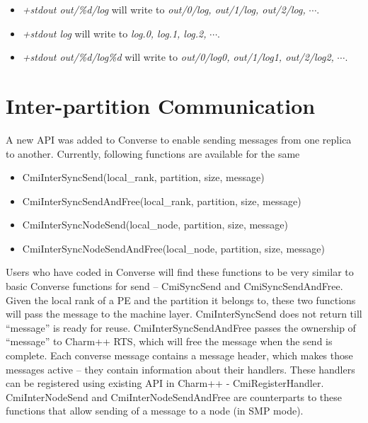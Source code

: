 \begin{itemize}
\item \emph{+stdout out/\%d/log} will write to \emph{out/0/log, out/1/log,
out/2/log,} $\cdots$.
\item \emph{+stdout log} will write to \emph{log.0, log.1, log.2,} $\cdots$.
\item \emph{+stdout out/\%d/log\%d} will write to \emph{out/0/log0, out/1/log1,
out/2/log2,} $\cdots$.
\end{itemize}

\section{Inter-partition Communication}

A new API was added to Converse to enable sending messages from one replica to
another. Currently, following functions are available for the same
\begin{itemize}
\item CmiInterSyncSend(local\_rank, partition, size, message)        
\item CmiInterSyncSendAndFree(local\_rank, partition, size, message)
\item CmiInterSyncNodeSend(local\_node, partition, size, message)        
\item CmiInterSyncNodeSendAndFree(local\_node, partition, size, message)
\end{itemize}

Users who have coded in Converse will find these functions to be very similar
to basic Converse functions for send – CmiSyncSend and CmiSyncSendAndFree.
Given the local rank of a PE and the partition it belongs to, these two
functions will pass the message to the machine layer. CmiInterSyncSend does
not return till “message” is ready for reuse. CmiInterSyncSendAndFree passes
the ownership of “message” to Charm++ RTS, which will free the message when
the send is complete. Each converse message contains a message header, which
makes those messages active – they contain information about their handlers.
These handlers can be registered using existing API in Charm++ -
CmiRegisterHandler.  CmiInterNodeSend and CmiInterNodeSendAndFree are
counterparts to these functions that allow sending of a message to a node (in
    SMP mode).


